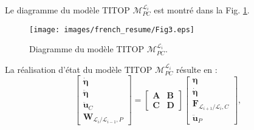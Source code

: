 Le diagramme du mod\`ele TITOP $\mathcal{M}_{PC}^{\mathcal{L}_i}$ est montr\'e dans la Fig. \ref{fig:block_titop_fr}.

\begin{figure}[ht]
\centering
\texttt{[image: images/french\_resume/Fig3.eps]} %
\caption{Diagramme du mod\`ele TITOP $\mathbf{\mathcal{M}}_{PC}^{\mathcal{L}_i}$.} 
\label{fig:block_titop_fr}
\end{figure}

La r\'ealisation d'\'etat du mod\`ele TITOP $\mathcal{M}_{PC}^{\mathcal{L}_i}$ r\'esulte en : 
\begin{equation}
	\left[\begin{array}{c} 
		\dot{\bm{\eta}} \\ \ddot{\bm{\eta}} \\ \hline
		\ddot{\mathbf{u}}_C \\ \mathbf{W}_{\mathcal{L}_{i}/\mathcal{L}_{i-1},P}
	\end{array} \right] =
	\left[\begin{array}{c|c}
		 \mathbf{A} & \mathbf{B} \\
		 \hline
		 \mathbf{C} & \mathbf{D}
	\end{array} \right]
	\left[\begin{array}{c} 
		\bm{\eta} \\ \dot{\bm{\eta}} \\ \hline \mathbf{F}_{\mathcal{L}_{i+1}/\mathcal{L}_{i},C} \\ \ddot{\mathbf{u}}_P
	\end{array} \right],
	\label{eq:titop_model_fr}
\end{equation}

